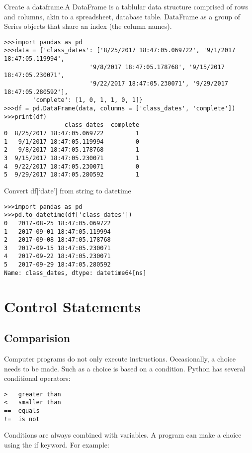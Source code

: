 Create a dataframe.A DataFrame is a tablular data structure comprised of
rows and columns, akin to a spreadsheet, database table. DataFrame as a
group of Series objects that share an index (the column names).

\begin{verbatim}
>>>import pandas as pd
>>>data = {'class_dates': ['8/25/2017 18:47:05.069722', '9/1/2017 18:47:05.119994', 
                        '9/8/2017 18:47:05.178768', '9/15/2017 18:47:05.230071', 
                        '9/22/2017 18:47:05.230071', '9/29/2017 18:47:05.280592'], 
        'complete': [1, 0, 1, 1, 0, 1]} 
>>>df = pd.DataFrame(data, columns = ['class_dates', 'complete'])
>>>print(df)
                 class_dates  complete
0  8/25/2017 18:47:05.069722         1
1   9/1/2017 18:47:05.119994         0
2   9/8/2017 18:47:05.178768         1
3  9/15/2017 18:47:05.230071         1
4  9/22/2017 18:47:05.230071         0
5  9/29/2017 18:47:05.280592         1
\end{verbatim}

Convert df{[}`date'{]} from string to datetime

\begin{verbatim}
>>>import pandas as pd
>>>pd.to_datetime(df['class_dates'])
0   2017-08-25 18:47:05.069722
1   2017-09-01 18:47:05.119994
2   2017-09-08 18:47:05.178768
3   2017-09-15 18:47:05.230071
4   2017-09-22 18:47:05.230071
5   2017-09-29 18:47:05.280592
Name: class_dates, dtype: datetime64[ns]
\end{verbatim}

\section{Control Statements}\label{control-statements}

\subsection{Comparision}\label{comparision}

Computer programs do not only execute instructions. Occasionally, a
choice needs to be made. Such as a choice is based on a condition.
Python has several conditional operators:

\begin{verbatim}
>   greater than
<   smaller than
==  equals
!=  is not
\end{verbatim}

Conditions are always combined with variables. A program can make a
choice using the if keyword. For example:

